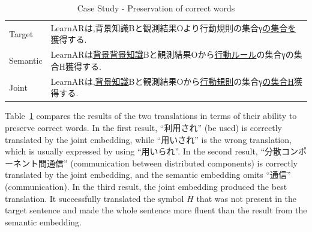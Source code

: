 \begin{table}[h]
    \begin{CJK}{UTF8}{long}
        \begin{tabularx}{\textwidth}{p{1.2cm}b}
            Target & LearnARは,背景知識Bと観測結果Oより行動規則の集合γ\underline{の集合を}獲得する. \\
            Semantic & LearnARは\underline{背景背景知識}Bと観測結果Oから\underline{行動ルール}の集合γの集合H獲得する. \\
            Joint & LearnARは,\underline{背景知識}Bと観測結果Oから\underline{行動規則}の集合γ\underline{の集合H}獲得する. \\\midrule
        \end{tabularx}
    \end{CJK}

    \caption{Case Study - Preservation of correct words}
    \label{tab:case_study1}
\end{table}

\begin{CJK}{UTF8}{long}
    Table~\ref{tab:case_study1} compares the results of the two translations in terms of their ability to preserve correct words. In the first result, ``利用され'' (be used) is correctly translated by the joint embedding, while ``用いされ'' is the wrong translation, which is usually expressed by using ``用いられ''. In the second result, ``分散コンポーネント間通信'' (communication between distributed components) is correctly translated by the joint embedding, and the semantic embedding omits ``通信'' (communication). In the third result, the joint embedding produced the best translation. It successfully translated the symbol $H$ that was not present in the target sentence and made the whole sentence more fluent than the result from the semantic embedding.
\end{CJK}

